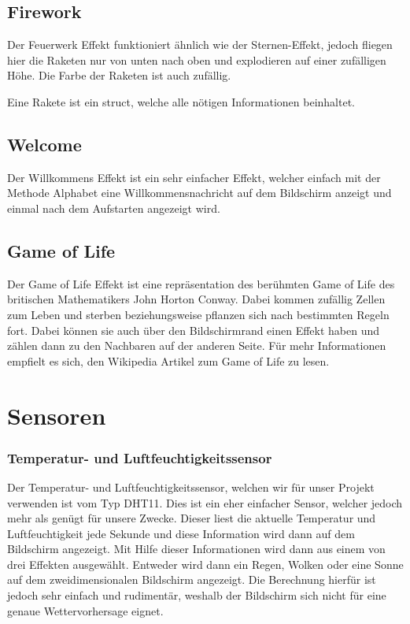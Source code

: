 \documentclass[12pt,a4paper]{article}
\begin{document}
\subsection{Firework}

Der Feuerwerk Effekt funktioniert ähnlich wie der Sternen-Effekt, jedoch fliegen hier die Raketen nur von unten nach oben und explodieren auf einer zufälligen Höhe. Die Farbe der Raketen ist auch zufällig.

Eine Rakete ist ein struct, welche alle nötigen Informationen beinhaltet.

\subsection{Welcome}

Der Willkommens Effekt ist ein sehr einfacher Effekt, welcher einfach mit der Methode Alphabet eine Willkommensnachricht auf dem Bildschirm anzeigt und einmal nach dem Aufstarten angezeigt wird.

\subsection{Game of Life}

Der Game of Life Effekt ist eine repräsentation des berühmten Game of Life des britischen Mathematikers John Horton Conway. Dabei kommen  zufällig Zellen zum Leben und sterben beziehungsweise pflanzen sich nach bestimmten Regeln fort. Dabei können sie auch über den Bildschirmrand einen Effekt haben und zählen dann zu den Nachbaren auf der anderen Seite. Für mehr Informationen empfielt es sich, den Wikipedia Artikel zum Game of Life zu lesen.

\section{Sensoren}

\subsubsection{Temperatur- und Luftfeuchtigkeitssensor}

Der Temperatur- und Luftfeuchtigkeitssensor, welchen wir für unser Projekt verwenden ist vom Typ DHT11. Dies ist ein eher einfacher Sensor, welcher jedoch mehr als genügt für unsere Zwecke. Dieser liest die aktuelle Temperatur und Luftfeuchtigkeit jede Sekunde und diese Information wird dann auf dem Bildschirm angezeigt. Mit Hilfe dieser Informationen wird dann aus einem von drei Effekten ausgewählt. Entweder wird dann ein Regen, Wolken oder eine Sonne auf dem zweidimensionalen Bildschirm angezeigt. Die Berechnung hierfür ist jedoch sehr einfach und rudimentär, weshalb der Bildschirm sich nicht für eine genaue Wettervorhersage eignet. 
\end{document}
